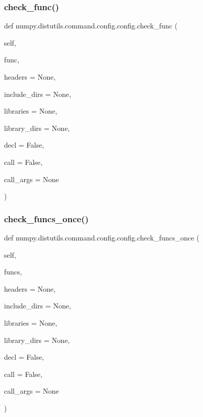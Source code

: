 \subsubsection{\texorpdfstring{check\+\_\+func()}{check\_func()}}
{\footnotesize\ttfamily def numpy.\+distutils.\+command.\+config.\+config.\+check\+\_\+func (\begin{DoxyParamCaption}\item[{}]{self,  }\item[{}]{func,  }\item[{}]{headers = {\ttfamily None},  }\item[{}]{include\+\_\+dirs = {\ttfamily None},  }\item[{}]{libraries = {\ttfamily None},  }\item[{}]{library\+\_\+dirs = {\ttfamily None},  }\item[{}]{decl = {\ttfamily False},  }\item[{}]{call = {\ttfamily False},  }\item[{}]{call\+\_\+args = {\ttfamily None} }\end{DoxyParamCaption})}

\mbox{\label{classnumpy_1_1distutils_1_1command_1_1config_1_1config_abb578f61e671672d0d8cc090d5106532}} 
\subsubsection{\texorpdfstring{check\+\_\+funcs\+\_\+once()}{check\_funcs\_once()}}
{\footnotesize\ttfamily def numpy.\+distutils.\+command.\+config.\+config.\+check\+\_\+funcs\+\_\+once (\begin{DoxyParamCaption}\item[{}]{self,  }\item[{}]{funcs,  }\item[{}]{headers = {\ttfamily None},  }\item[{}]{include\+\_\+dirs = {\ttfamily None},  }\item[{}]{libraries = {\ttfamily None},  }\item[{}]{library\+\_\+dirs = {\ttfamily None},  }\item[{}]{decl = {\ttfamily False},  }\item[{}]{call = {\ttfamily False},  }\item[{}]{call\+\_\+args = {\ttfamily None} }\end{DoxyParamCaption})}

